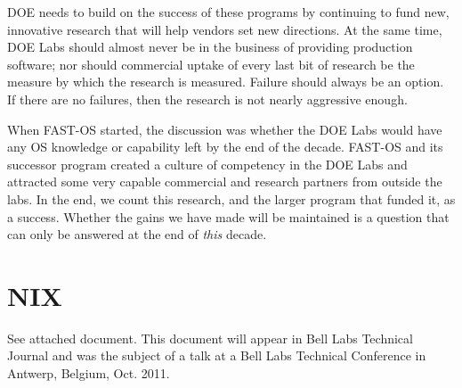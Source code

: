 \documentclass{report}
\begin{document}
DOE needs to build on the success of these programs by continuing
to fund new, innovative research that will 
help vendors set new directions. At the same time, DOE Labs should almost never be in the business of 
providing production software; nor should commercial uptake of every last bit of research be the measure 
by which the research is measured. Failure should always be an option. If there are no failures, 
then the research is not nearly aggressive enough. 

When FAST-OS started, the discussion was whether the DOE Labs would have any OS 
knowledge or capability left by the end of the decade. FAST-OS and its successor
program created a culture of competency in the DOE Labs and attracted some very 
capable commercial and research partners  from outside the labs. 
In the end, we count this research, 
and the larger program that funded it, as a success. Whether
the gains we have made will be maintained is a question that can only 
be answered at the end of {\em this} decade. 

% 




\appendix
\section{NIX}
See attached document.
This document will appear in Bell Labs Technical Journal and was the subject
of a talk at a Bell Labs Technical Conference in Antwerp, Belgium, Oct. 2011. 
\end{document}
